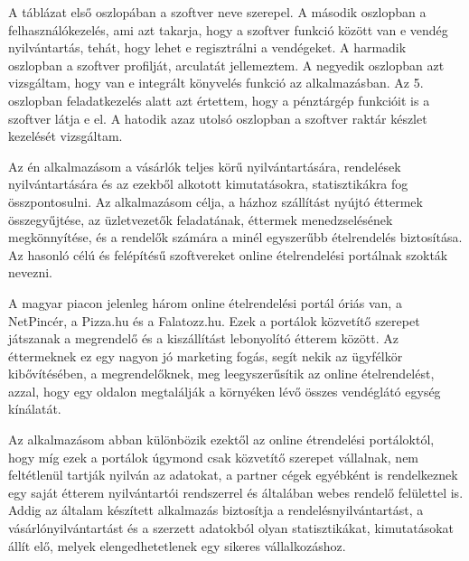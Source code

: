 A táblázat első oszlopában a szoftver neve szerepel. A második oszlopban a felhasználókezelés, ami azt takarja, hogy a szoftver funkció között van e vendég nyilvántartás, tehát, hogy lehet e regisztrálni a vendégeket. A harmadik oszlopban a szoftver profilját, arculatát jellemeztem. A negyedik oszlopban azt vizsgáltam, hogy van e integrált könyvelés funkció az alkalmazásban. Az 5. oszlopban feladatkezelés alatt azt értettem, hogy a pénztárgép funkcióit is a szoftver látja e el. A hatodik azaz utolsó oszlopban a szoftver raktár készlet kezelését vizsgáltam.

Az én alkalmazásom a vásárlók teljes körű nyilvántartására, rendelések nyilvántartására és az ezekből alkotott kimutatásokra, statisztikákra fog összpontosulni. Az alkalmazásom célja, a házhoz szállítást nyújtó éttermek összegyűjtése, az üzletvezetők feladatának, éttermek menedzselésének megkönnyítése, és a rendelők számára a minél egyszerűbb ételrendelés biztosítása. Az hasonló célú és felépítésű szoftvereket online ételrendelési portálnak szokták nevezni.

A magyar piacon jelenleg három online ételrendelési portál óriás van, a NetPincér, a Pizza.hu és a Falatozz.hu. Ezek a portálok közvetítő szerepet játszanak a megrendelő és a kiszállítást lebonyolító étterem között. Az éttermeknek ez egy nagyon jó marketing fogás, segít nekik az ügyfélkör kibővítésében, a megrendelőknek, meg leegyszerűsítik az online ételrendelést, azzal, hogy egy oldalon megtalálják a környéken lévő összes vendéglátó egység kínálatát.

Az alkalmazásom abban különbözik ezektől az online étrendelési portáloktól, hogy míg ezek a portálok úgymond csak közvetítő szerepet vállalnak, nem feltétlenül tartják nyilván az adatokat, a partner cégek egyébként is rendelkeznek egy saját étterem nyilvántartói rendszerrel és általában webes rendelő felülettel is. Addig az általam készített alkalmazás biztosítja a rendelésnyilvántartást, a vásárlónyilvántartást és a szerzett adatokból olyan statisztikákat, kimutatásokat állít elő, melyek elengedhetetlenek egy sikeres vállalkozáshoz.
